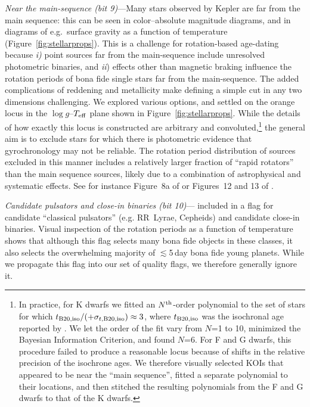 \documentclass[11pt,twocolumn,tighten]{aastex63}
\begin{document}
{\it Near the main-sequence (bit 9)}---Many stars observed by Kepler
are far from the main sequence: this can be seen in color--absolute
magnitude diagrams, and in diagrams of e.g.~surface gravity as a
function of temperature (Figure~\ref{fig:stellarprops}).  This is a
challenge for rotation-based age-dating because {\it i)} point sources
far from the main-sequence include unresolved photometric binaries,
and {\it ii}) effects other than magnetic braking influence the
rotation periods of bona fide single stars far from the main-sequence.
The added complications of reddening and metallicity make defining a
simple cut in any two dimensions challenging.  
We explored various options, and settled on the orange locus in the
$\log g$--$T_{\rm eff}$ plane shown in Figure~\ref{fig:stellarprops}.
While the details of how exactly this locus is constructed are
arbitrary and convoluted,\footnote{In practice, for K dwarfs we fitted an
$N^{\rm th}$-order polynomial to the set of stars for which $t_{\rm
B20,iso}/(+\sigma_{t,{\rm B20,iso}})\approx 3$, where
$t_{\rm B20,iso}$ was the isochronal age reported by
\citet{Berger_2020a_catalog}. We let the order of the fit vary from
$N$=1 to 10, minimized the Bayesian Information Criterion,
and found $N$=6.  For F and G dwarfs, this procedure failed to produce
a reasonable locus because of shifts in the relative precision of
the isochrone ages.  We therefore visually selected KOIs that appeared
to be near the ``main sequence'', fitted a separate polynomial to
their locations, and then stitched the resulting polynomials from the
F and G dwarfs to that of the K dwarfs.} the general 
aim is to exclude stars for which there is photometric evidence
that gyrochronology may not be reliable.  The rotation period
distribution of sources excluded in this manner includes a relatively
larger fraction of ``rapid rotators'' than the main sequence sources,
likely due to a combination of astrophysical and systematic effects.
See for instance Figure~8a of \citet{2022AJ....164..137K} or Figures~12 and 13
of \citet{2023ApJS..268....4F}.


{\it Candidate pulsators and close-in binaries (bit
10)}---\citeauthor{Santos_2021} included in a flag for candidate
``classical pulsators'' (e.g. RR~Lyrae, Cepheids) and candidate
close-in binaries.  Visual inspection of the rotation periods as a
function of temperature shows that although this flag selects many
bona fide objects in these classes, it also selects the overwhelming
majority of $\lesssim$5\,day bona fide young planets.  While we
propagate this flag into our set of quality flags, we therefore
generally ignore it.
\end{document}
